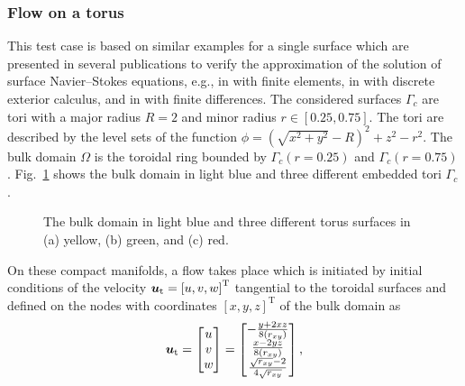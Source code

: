 \documentclass[12pt, twoside, english]{article}
\numberwithin{equation}{section}
\newcommand{\vek}[1]{\mathchoice{\displaystyle\boldsymbol#1}
{\textstyle\boldsymbol#1}{\scriptstyle\boldsymbol#1}
{\scriptscriptstyle\boldsymbol#1}}
\newcommand{\ti}{ \ensuremath{\mathrm{t} }}
\begin{document}
\subsubsection{Flow on a torus}
This test case is based on similar examples for a single surface which are presented in several publications to verify the approximation of the solution of surface Navier--Stokes equations, e.g., in \cite{Rank_2021a,Reuther_2018a} with finite elements, in \cite{Nitschke_2017a} with discrete exterior calculus, and in \cite{Yang_2020a} with finite differences. The considered surfaces $\Gamma_{\!c}$ are tori with a major radius $R = 2$ and minor radius $r \in \left[0.25,0.75\right]$. The tori are described by the level sets of the function $\phi = \left(\sqrt{x^2+y^2}-R\right)^2+z^2-r^2$. The bulk domain $\Omega$ is the toroidal ring bounded by  $\Gamma_{\!c}\left(r = 0.25\right)$ and $\Gamma_{\!c}\left(r = 0.75\right)$. Fig.~\ref{fig:Torus-setup} shows the bulk domain in light blue and three different embedded tori $\Gamma_{\!c}$.
\begin{figure}
	\centering
	
	\hspace{0.5cm}
	\hspace{0.5cm}
	
	\caption{\label{fig:Torus-setup} The bulk domain in light blue and three different torus surfaces in (a) yellow, (b) green, and (c) red.}
\end{figure}
On these compact manifolds, a flow takes place which is initiated by initial conditions of the velocity $\vek{u}_\ti = \left[u,v,w\right]^{\mathrm{T}}$ tangential to the toroidal surfaces and defined on the nodes with coordinates $\left[x,y,z\right]^{\mathrm{T}}$ of the bulk domain as
\begin{equation}
	\vek{u}_\ti = \begin{bmatrix}
		u \\ v \\ w
	\end{bmatrix} = \begin{bmatrix}
	-\frac{y + 2 x z}{8 \left(r_{xy}\right)} \\ 
	\frac{x - 2 y z}{8 \left(r_{xy}\right)}  \\ 
	\frac{\sqrt{r_{xy}}-2}{4 \sqrt{r_{xy}}}
	\end{bmatrix},
\end{equation}
\end{document}
